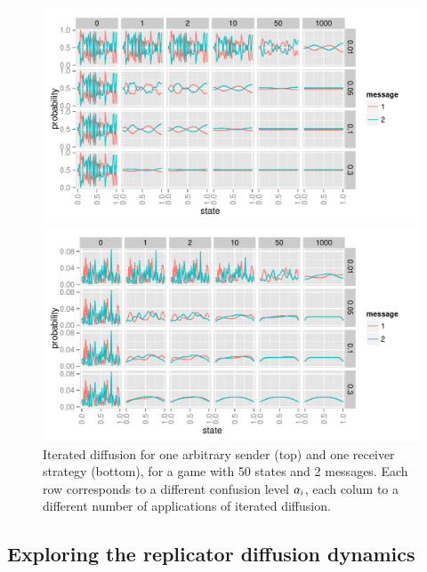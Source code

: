 \begin{figure}
  \centering

  \includegraphics[width=\textwidth]{plots/confusion_sender.pdf}
  
  \includegraphics[width=\textwidth]{plots/confusion_receiver.pdf}

  \caption{Iterated diffusion for one arbitrary sender (top) and one
    receiver strategy (bottom), for a game with 50 states and 2
    messages. Each row corresponds to a different confusion level
    $\alpha_i$, each colum to a different number of applications of
    iterated diffusion.}
  \label{fig:confusion-SenRec}
\end{figure}

\subsection{Exploring the replicator diffusion dynamics}
\label{sec:simulations}

